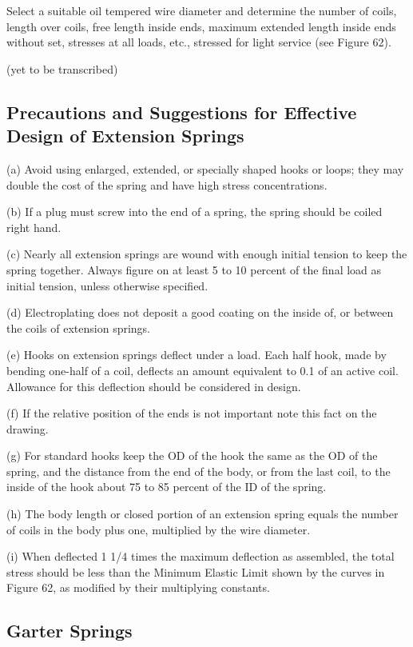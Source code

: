 \documentclass[10pt]{article}
\begin{document}
Select a suitable oil tempered wire diameter and determine the number of coils, length over coils, free length inside ends, maximum extended length inside ends without set, stresses at all loads, etc., stressed for light service (see Figure 62).

(yet to be transcribed)

\subsection{Precautions and Suggestions for Effective Design of Extension Springs} %
(a) Avoid using enlarged, extended, or specially shaped hooks or loops; they may double the cost of the spring and have high stress concentrations.

(b) If a plug must screw into the end of a spring, the spring should be coiled right hand.

(c) Nearly all extension springs are wound with enough initial tension to keep the spring together. Always figure on at least 5 to 10 percent of the final load as initial tension, unless otherwise specified.

(d) Electroplating does not deposit a good coating on the inside of, or between the coils of extension springs.

(e) Hooks on extension springs deflect under a load.
Each half hook, made by bending one-half of a coil, deflects an amount equivalent to 0.1 of an active coil.
Allowance for this deflection should be considered in design.

(f) If the relative position of the ends is not important note this fact on the drawing.

(g) For standard hooks keep the OD of the hook the same as the OD of the spring, and the distance from the end of the body, or from the last coil, to the inside of the hook about 75 to 85 percent of the ID of the spring.

(h) The body length or closed portion of an extension spring equals the number of coils in the body plus one, multiplied by the wire diameter.

(i) When deflected 1 1/4 times the maximum deflection as assembled, the total stress should be less than the Minimum Elastic Limit shown by the curves in Figure 62, as modified by their multiplying constants.

\subsection{Garter Springs} %
\end{document}
